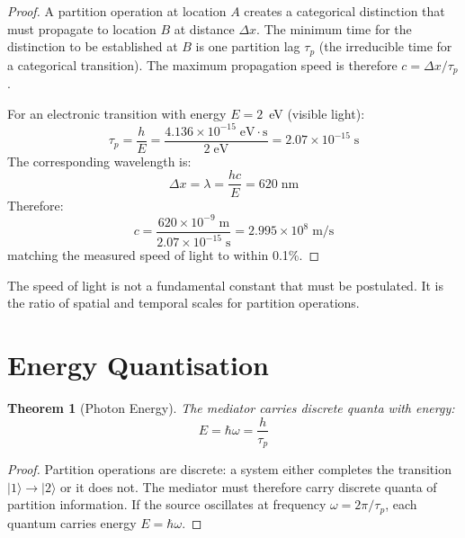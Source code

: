 \documentclass[twocolumn,10pt,a4paper]{article}
\theoremstyle{plain}
\newtheorem{theorem}{Theorem}[section]
\theoremstyle{definition}
\theoremstyle{remark}
\newcommand{\taup}{\tau_p}
\begin{document}
\begin{proof}
A partition operation at location $A$ creates a categorical distinction that must propagate to location $B$ at distance $\Delta x$. The minimum time for the distinction to be established at $B$ is one partition lag $\taup$ (the irreducible time for a categorical transition). The maximum propagation speed is therefore $c = \Delta x/\taup$.

For an electronic transition with energy $E = 2$~eV (visible light):
\begin{equation}
    \taup = \frac{h}{E} = \frac{4.136 \times 10^{-15}\;\mathrm{eV\cdot s}}{2\;\mathrm{eV}} = 2.07 \times 10^{-15}\;\mathrm{s}
\end{equation}
The corresponding wavelength is:
\begin{equation}
    \Delta x = \lambda = \frac{hc}{E} = 620\;\mathrm{nm}
\end{equation}
Therefore:
\begin{equation}
    c = \frac{620 \times 10^{-9}\;\mathrm{m}}{2.07 \times 10^{-15}\;\mathrm{s}} = 2.995 \times 10^8\;\mathrm{m/s}
\end{equation}
matching the measured speed of light to within 0.1\%.
\end{proof}

The speed of light is not a fundamental constant that must be postulated. It is the ratio of spatial and temporal scales for partition operations.

\section{Energy Quantisation}
\label{sec:quantisation}

\begin{theorem}[Photon Energy]
\label{thm:photon}
The mediator carries discrete quanta with energy:
\begin{equation}
\boxed{E = \hbar\omega = \frac{h}{\taup}}
\end{equation}
\end{theorem}

\begin{proof}
Partition operations are discrete: a system either completes the transition $|1\rangle \to |2\rangle$ or it does not. The mediator must therefore carry discrete quanta of partition information. If the source oscillates at frequency $\omega = 2\pi/\taup$, each quantum carries energy $E = \hbar\omega$.
\end{proof}
\end{document}
